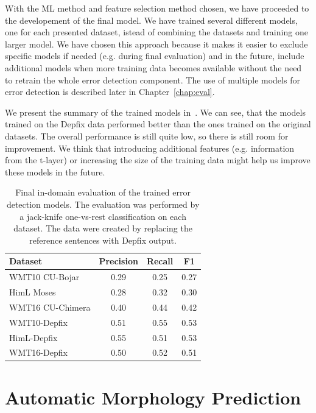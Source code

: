 With the ML method and feature selection method chosen, we have proceeded to 
the developement of the final model.
We have trained several different models, one for each presented dataset, istead of combining
the datasets and training one larger model. We have chosen this approach because it makes
it easier to exclude specific models if needed (e.g. during final evaluation) and in the
future, include additional models when more training data becomes available without the need
to retrain the whole error detection component. The use of multiple models for error detection
is described later in Chapter~\ref{chap:eval}.

We present the summary of the trained models in~. We can see, that the models
trained on the Depfix data performed better than the ones trained on the original datasets. The overall
performance is still quite low, so there is still room for improvement. We think that introducing
additional features (e.g. information from the t-layer) or increasing the size of the training data
might help us improve these models in the future.

\begin{table}[t]
\centering
\small

\begin{tabular}{l|ccc}
Dataset  &  Precision  &  Recall  &  F1  \\
\hline
WMT10 CU-Bojar  &  0.29  &  0.25  &  0.27  \\
HimL Moses  &  0.28  &  0.32  &  0.30  \\
WMT16 CU-Chimera  &  0.40  &  0.44  &  0.42  \\
WMT10-Depfix  &  0.51  &  0.55  &  0.53  \\
HimL-Depfix  &  0.55  &  0.51  &  0.53  \\
WMT16-Depfix  &  0.50  &  0.52  &  0.51  \\
\end{tabular}
\caption{
    Final in-domain evaluation of the trained error detection models. The evaluation was performed
by a jack-knife one-vs-rest classification on each dataset. The  data were created
by replacing the reference sentences with Depfix output.
}
\label{wf-summary}
\end{table}


\section{Automatic Morphology Prediction}

